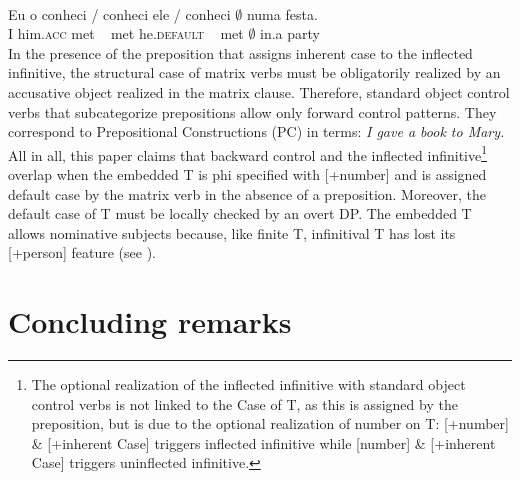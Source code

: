 \documentclass[output=paper]{langsci/langscibook}
\begin{document}
\ea%
    \citep[328]{Farrell1990}\label{ex:moreno:29}\\
    \gll Eu  o       conheci \slash{} conheci ele        \slash{}  conheci {$\emptyset$} numa festa. \\
         I  him.\textsc{acc} met  ~  met  he.\textsc{default} ~ met   {$\emptyset$} in.a    party\\
\z
In the presence of the preposition that assigns inherent case to the inflected infinitive, the structural case of matrix verbs must be obligatorily realized by an accusative object realized in the matrix clause. Therefore, standard object control verbs that subcategorize prepositions allow only forward control patterns. They correspond to Prepositional Constructions (PC) in  terms: \textit{I gave a book to Mary.}
All in all, this paper claims that backward control and the inflected infinitive\footnote{The optional realization of the inflected infinitive with standard object control verbs is not linked to the Case of T, as this is assigned by the preposition, but is due to the optional realization of number on T: [+number] \& [+inherent Case]  triggers inflected infinitive while [\textminus number] \& [+inherent Case] triggers uninflected infinitive.} overlap when the embedded T is phi specified with [+number] and is assigned default case by the matrix verb in the absence of a preposition. Moreover, the default case of T must be locally checked by an overt DP. The embedded T allows nominative subjects because, like finite T, infinitival T has lost its [+person] feature (see \citealt{Cyrino2010}).

\section{Concluding remarks}%
\end{document}
